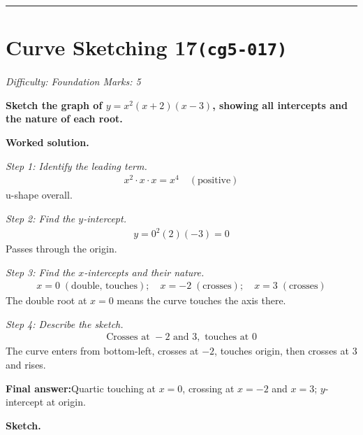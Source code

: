 \documentclass[11pt]{article}
\newcommand{\question}[1]{\par\medskip\noindent\textbf{#1}\par}
\begin{document}
\medskip\hrule

\section*{Curve Sketching 17\quad\small\texttt{(cg5-017)}}
\textit{Difficulty: Foundation \quad\textbar\quad Marks: 5}

\question{Sketch the graph of \( y = x^2(x + 2)(x - 3) \), showing all intercepts and the nature of each root.}

\textbf{Worked solution.}

\textit{Step 1: Identify the leading term.}
\[\begin{gathered}
x^2 \cdot x \cdot x = x^4 \quad (\text{positive})
\end{gathered}\]
u-shape overall.

\textit{Step 2: Find the \( y \)-intercept.}
\[\begin{gathered}
y = 0^2(2)(-3) = 0
\end{gathered}\]
Passes through the origin.

\textit{Step 3: Find the \( x \)-intercepts and their nature.}
\[\begin{gathered}
x = 0 \;(\text{double, touches}); \quad x = -2 \;(\text{crosses}); \quad x = 3 \;(\text{crosses})
\end{gathered}\]
The double root at \( x = 0 \) means the curve touches the axis there.

\textit{Step 4: Describe the sketch.}
\[\begin{gathered}
\text{Crosses at } -2 \text{ and } 3, \text{ touches at } 0
\end{gathered}\]
The curve enters from bottom-left, crosses at \( -2 \), touches origin, then crosses at \( 3 \) and rises.

\begin{answerbox}
\textbf{Final answer:}\quad Quartic touching at \(\displaystyle x = 0\), crossing at \(\displaystyle x = -2\) and \(\displaystyle x = 3\); \(\displaystyle y\)-intercept at origin.
\end{answerbox}
\textbf{Sketch.}
\end{document}
